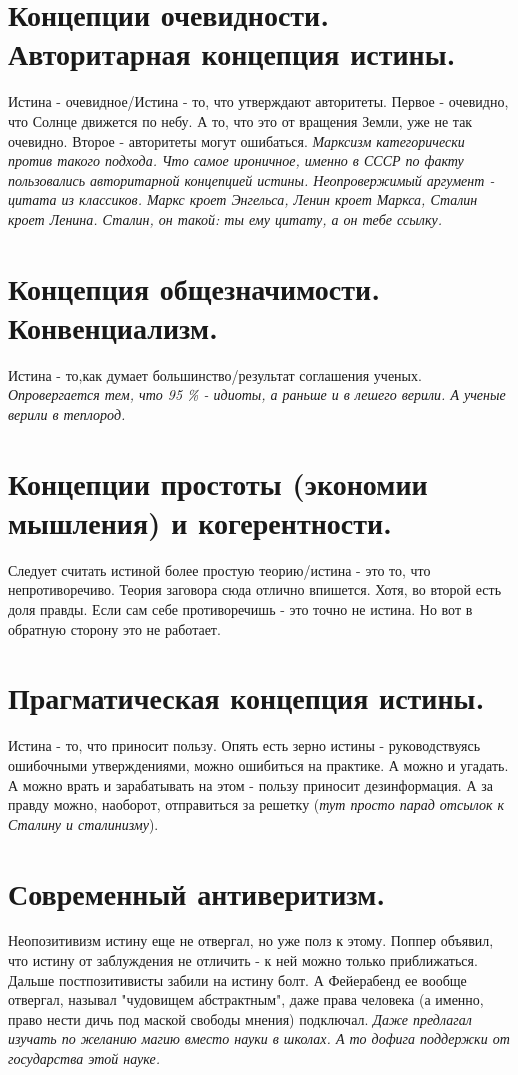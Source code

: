 \section{ Концепции очевидности. Авторитарная концепция истины.}
Истина - очевидное/Истина - то, что утверждают авторитеты. Первое - очевидно, что Солнце движется по небу. А то, что это от вращения Земли, уже не так очевидно. Второе - авторитеты могут ошибаться. \textit{Марксизм категорически против такого подхода. Что самое ироничное, именно в СССР по факту пользовались авторитарной концепцией истины. Неопровержимый аргумент - цитата из классиков. Маркс кроет Энгельса, Ленин кроет Маркса, Сталин кроет Ленина. Сталин, он такой: ты ему цитату, а он тебе ссылку.}

\section{ Концепция общезначимости. Конвенциализм.}
Истина - то,как думает большинство/результат соглашения ученых. \textit{Опровергается тем, что 95 \% - идиоты, а раньше и в лешего верили. А ученые верили в теплород.}

\section{ Концепции простоты (экономии мышления) и когерентности.}
Следует считать истиной более простую теорию/истина - это то, что непротиворечиво. Теория заговора сюда отлично впишется. Хотя, во второй есть доля правды. Если сам себе противоречишь - это точно не истина. Но вот в обратную сторону это не работает.

\section{ Прагматическая концепция истины.}
Истина - то, что приносит пользу. Опять есть зерно истины - руководствуясь ошибочными утверждениями, можно ошибиться на практике. А можно и угадать. А можно врать и зарабатывать на этом - пользу приносит дезинформация. А за правду можно, наоборот, отправиться за решетку (\textit{тут просто парад отсылок к Сталину и сталинизму}). 

\section{ Современный антиверитизм.}
Неопозитивизм истину еще не отвергал, но уже полз к этому. Поппер объявил, что истину от заблуждения не отличить - к ней можно только приближаться. Дальше постпозитивисты забили на истину болт. А Фейерабенд ее вообще отвергал, называл "чудовищем абстрактным", даже права человека (а именно, право нести дичь под маской свободы мнения) подключал. \textit{Даже предлагал изучать по желанию магию вместо науки в школах. А то дофига поддержки от государства этой науке.}

